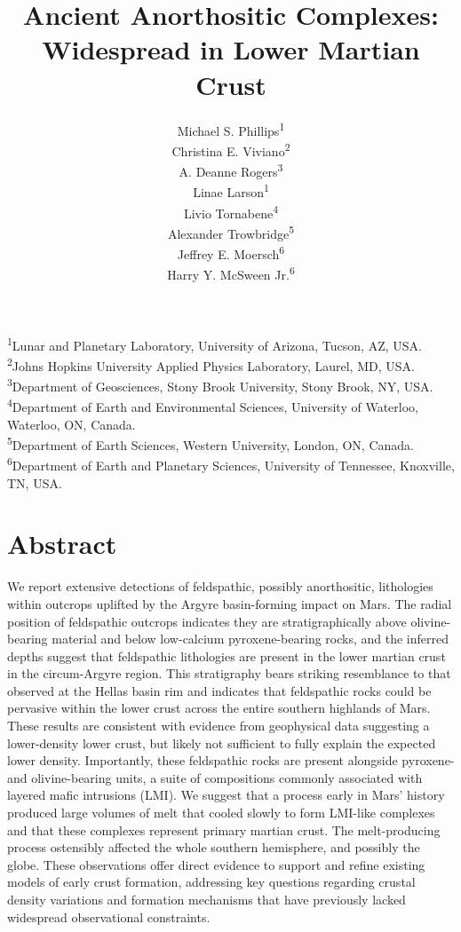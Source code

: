 \documentclass[12pt]{article}
\title{\textbf{Ancient Anorthositic Complexes: Widespread in Lower Martian Crust}}
\author{Michael S. Phillips\textsuperscript{1}\\ 
Christina E. Viviano\textsuperscript{2}\\
A. Deanne Rogers\textsuperscript{3}\\
Linae Larson\textsuperscript{1}\\
Livio Tornabene\textsuperscript{4}\\
Alexander Trowbridge\textsuperscript{5}\\
Jeffrey E. Moersch\textsuperscript{6}\\
Harry Y. McSween Jr.\textsuperscript{6}}
\begin{document}
\maketitle

\begin{flushleft}
\textsuperscript{1}Lunar and Planetary Laboratory, University of Arizona, Tucson, AZ, USA.\\
\textsuperscript{2}Johns Hopkins University Applied Physics Laboratory, Laurel, MD, USA.\\
\textsuperscript{3}Department of Geosciences, Stony Brook University, Stony Brook, NY, USA.\\
\textsuperscript{4}Department of Earth and Environmental Sciences, University of Waterloo, Waterloo, ON, Canada.\\
\textsuperscript{5}Department of Earth Sciences, Western University, London, ON, Canada.\\
\textsuperscript{6}Department of Earth and Planetary Sciences, University of Tennessee, Knoxville, TN, USA.\\
\end{flushleft}

\newpage
\section*{Abstract}
\setlength{\parindent}{0em} %
\setlength{\parskip}{6pt}   %
We report extensive detections of feldspathic, possibly anorthositic, lithologies within outcrops uplifted by the Argyre basin-forming impact on Mars. The radial position of feldspathic outcrops indicates they are stratigraphically above olivine-bearing material and below low-calcium pyroxene-bearing rocks, and the inferred depths suggest that feldspathic lithologies are present in the lower martian crust in the circum-Argyre region. This stratigraphy bears striking resemblance to that observed at the Hellas basin rim and indicates that feldspathic rocks could be pervasive within the lower crust across the entire southern highlands of Mars. These results are consistent with evidence from geophysical data suggesting a lower-density lower crust, but likely not sufficient to fully explain the expected lower density. Importantly, these feldspathic rocks are present alongside pyroxene- and olivine-bearing units, a suite of compositions commonly associated with layered mafic intrusions (LMI). We suggest that a process early in Mars' history produced large volumes of melt that cooled slowly to form LMI-like complexes and that these complexes represent primary martian crust. The melt-producing process ostensibly affected the whole southern hemisphere, and possibly the globe. These observations offer direct evidence to support and refine existing models of early crust formation, addressing key questions regarding crustal density variations and formation mechanisms that have previously lacked widespread observational constraints.
\end{document}
